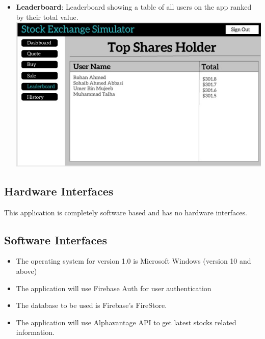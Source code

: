 \documentclass[12 pt, a4paper]{report}
\begin{document}
\begin{itemize}
		\item \textbf{Leaderboard}: Leaderboard showing a table of all users on the app ranked by their total value.\\
		\includegraphics[scale=0.5,keepaspectratio]{leaderboard}
	\end{itemize}
	
	\subsection {Hardware Interfaces}
	This application is completely software based and has no hardware interfaces.
	
	\subsection {Software Interfaces}

	\begin{itemize}
		\item The operating system for version 1.0 is Microsoft Windows (version 10 and above)
		\item The application will use Firebase Auth for user authentication
		\item The database to be used is Firebase's FireStore.
		\item The application will use Alphavantage API to get latest stocks related information.
	\end{itemize}
	
\end{document}
